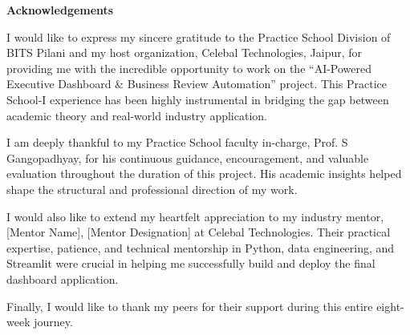 \documentclass{book}
\begin{document}
\newpage
\centerline{\Large \bf Acknowledgements}
\vspace*{1cm}

\par\noindent
I would like to express my sincere gratitude to the Practice School Division of BITS Pilani and my host organization, Celebal Technologies, Jaipur, for providing me with the incredible opportunity to work on the ``AI-Powered Executive Dashboard \& Business Review Automation'' project. This Practice School-I experience has been highly instrumental in bridging the gap between academic theory and real-world industry application.

\vspace*{0.4cm}
\par\noindent
I am deeply thankful to my Practice School faculty in-charge, Prof. S Gangopadhyay, for his continuous guidance, encouragement, and valuable evaluation throughout the duration of this project. His academic insights helped shape the structural and professional direction of my work.

\vspace*{0.4cm}
\par\noindent
I would also like to extend my heartfelt appreciation to my industry mentor, {[Mentor Name]}, {[Mentor Designation]} at Celebal Technologies. Their practical expertise, patience, and technical mentorship in Python, data engineering, and Streamlit were crucial in helping me successfully build and deploy the final dashboard application.

\vspace*{0.4cm}
\par\noindent
Finally, I would like to thank my peers for their support during this entire eight-week journey.

	\vfill

		\par{}




		
\end{document}
